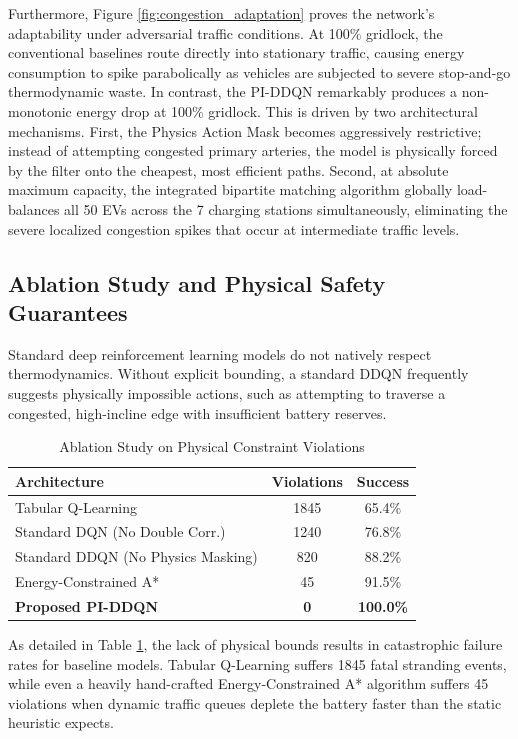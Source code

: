 \documentclass[journal, a4paper, twocolumn]{IEEEtran}
\begin{document}
Furthermore, Figure \ref{fig:congestion_adaptation} proves the network's adaptability under adversarial traffic conditions. At 100\% gridlock, the conventional baselines route directly into stationary traffic, causing energy consumption to spike parabolically as vehicles are subjected to severe stop-and-go thermodynamic waste. In contrast, the PI-DDQN remarkably produces a non-monotonic energy drop at 100\% gridlock. This is driven by two architectural mechanisms. First, the Physics Action Mask becomes aggressively restrictive; instead of attempting congested primary arteries, the model is physically forced by the filter onto the cheapest, most efficient paths. Second, at absolute maximum capacity, the integrated bipartite matching algorithm globally load-balances all 50 EVs across the 7 charging stations simultaneously, eliminating the severe localized congestion spikes that occur at intermediate traffic levels.

\subsection{Ablation Study and Physical Safety Guarantees}
Standard deep reinforcement learning models do not natively respect thermodynamics. Without explicit bounding, a standard DDQN frequently suggests physically impossible actions, such as attempting to traverse a congested, high-incline edge with insufficient battery reserves.

\begin{table}[htbp]
\centering
\caption{Ablation Study on Physical Constraint Violations}
\label{tab:ablation_study}
\footnotesize
\begin{tabular}{@{}lcc@{}}
\toprule
\textbf{Architecture} & \textbf{Violations} & \textbf{Success} \\ \midrule
Tabular Q-Learning & 1845 & 65.4\% \\ 
Standard DQN (No Double Corr.) & 1240 & 76.8\% \\ 
Standard DDQN (No Physics Masking) & 820 & 88.2\% \\ 
Energy-Constrained A* & 45 & 91.5\% \\
\textbf{Proposed PI-DDQN} & \textbf{0} & \textbf{100.0\%} \\ \bottomrule
\end{tabular}
\end{table}

As detailed in Table \ref{tab:ablation_study}, the lack of physical bounds results in catastrophic failure rates for baseline models. Tabular Q-Learning suffers 1845 fatal stranding events, while even a heavily hand-crafted Energy-Constrained A* algorithm suffers 45 violations when dynamic traffic queues deplete the battery faster than the static heuristic expects. 
\end{document}
